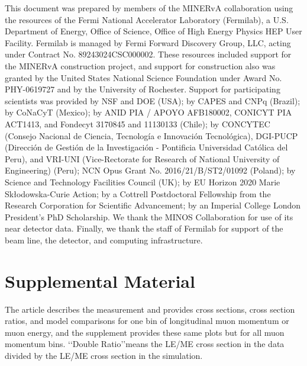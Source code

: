 \documentclass[aps,prl,twocolumn,showpacs,superscriptaddress, floatfix,10pt]{revtex4-2}
\begin{document}
\begin{acknowledgments}

This document was prepared by members of the MINERvA collaboration using the resources of the Fermi National Accelerator Laboratory (Fermilab), a U.S. Department of Energy, Office of Science, Office of High Energy Physics HEP User Facility. Fermilab is managed by Fermi Forward Discovery Group, LLC, acting under Contract No. 89243024CSC000002.  
These resources included support for the MINERvA construction project, and support
for construction also
was granted by the United States National Science Foundation under
Award No. PHY-0619727 and by the University of Rochester. Support for
participating scientists was provided by NSF and DOE (USA); by CAPES
and CNPq (Brazil); by CoNaCyT (Mexico); by ANID PIA / APOYO AFB180002, CONICYT PIA ACT1413, and Fondecyt 3170845 and 11130133 (Chile); 
by CONCYTEC (Consejo Nacional de Ciencia, Tecnolog\'ia e Innovaci\'on Tecnol\'ogica), DGI-PUCP (Direcci\'on de Gesti\'on de la Investigaci\'on  - Pontificia Universidad Cat\'olica del Peru), and VRI-UNI (Vice-Rectorate for Research of National University of Engineering) (Peru); NCN Opus Grant No. 2016/21/B/ST2/01092 (Poland); by Science and Technology Facilities Council (UK); by EU Horizon 2020 Marie Skłodowska-Curie Action; by a Cottrell Postdoctoral Fellowship from the Research Corporation for Scientific Advancement; by an Imperial College London President's PhD Scholarship.  We thank the MINOS Collaboration for use of its near detector data. Finally, we thank the staff of
Fermilab for support of the beam line, the detector, and computing infrastructure.
\end{acknowledgments}
{}


\clearpage
\onecolumngrid
\pagebreak
\section{Supplemental Material}

The article describes the measurement and provides cross sections, cross section ratios, and model comparisons for one bin of longitudinal muon momentum or muon energy, and the supplement provides these same plots but for all muon momentum bins.  \lq\lq Double Ratio\rq\rq means the LE/ME cross section in the data divided by the LE/ME cross section in the simulation.  
\end{document}
